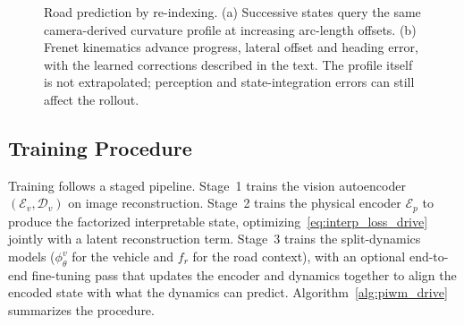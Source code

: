 \documentclass[preprint,12pt]{elsarticle}
\begin{document}
\begin{figure}[t]
\centering
{}
\caption{Road prediction by re-indexing. (a) Successive states query the same
camera-derived curvature profile at increasing arc-length offsets. (b) Frenet
kinematics advance progress, lateral offset and heading error, with the learned
corrections described in the text. The profile itself is not extrapolated;
perception and state-integration errors can still affect the rollout.}
\label{fig:prediction}
\end{figure}

\subsection{Training Procedure}

Training follows a staged pipeline.
Stage~1 trains the vision autoencoder $(\mathcal{E}_v, \mathcal{D}_v)$ on image
reconstruction.
Stage~2 trains the physical encoder $\mathcal{E}_p$ to produce the factorized
interpretable state, optimizing~\eqref{eq:interp_loss_drive} jointly with a latent
reconstruction term.
Stage~3 trains the split-dynamics models ($\phi^{v}_\theta$ for the vehicle and $f_r$
for the road context), with an optional end-to-end fine-tuning pass that updates
the encoder and dynamics together to align the encoded state with what the
dynamics can predict.
Algorithm~\ref{alg:piwm_drive} summarizes the procedure.
\end{document}

